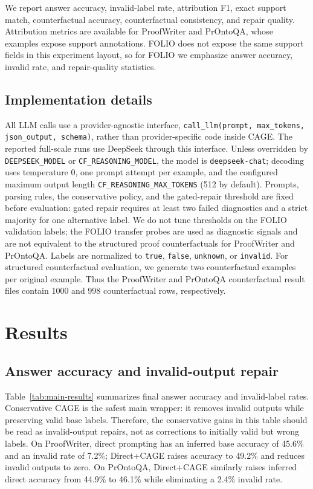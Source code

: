 \documentclass{article}
\begin{document}
We report answer accuracy, invalid-label rate, attribution F1, exact support match, counterfactual accuracy, counterfactual consistency, and repair quality. Attribution metrics are available for ProofWriter and PrOntoQA, whose examples expose support annotations. FOLIO does not expose the same support fields in this experiment layout, so for FOLIO we emphasize answer accuracy, invalid rate, and repair-quality statistics.

\subsection{Implementation details}

All LLM calls use a provider-agnostic interface, \texttt{call\_llm(prompt, max\_tokens, json\_output, schema)}, rather than provider-specific code inside CAGE. The reported full-scale runs use DeepSeek through this interface. Unless overridden by \texttt{DEEPSEEK\_MODEL} or \texttt{CF\_REASONING\_MODEL}, the model is \texttt{deepseek-chat}; decoding uses temperature 0, one prompt attempt per example, and the configured maximum output length \texttt{CF\_REASONING\_MAX\_TOKENS} (512 by default). Prompts, parsing rules, the conservative policy, and the gated-repair threshold are fixed before evaluation: gated repair requires at least two failed diagnostics and a strict majority for one alternative label. We do not tune thresholds on the FOLIO validation labels; the FOLIO transfer probes are used as diagnostic signals and are not equivalent to the structured proof counterfactuals for ProofWriter and PrOntoQA. Labels are normalized to \texttt{true}, \texttt{false}, \texttt{unknown}, or \texttt{invalid}. For structured counterfactual evaluation, we generate two counterfactual examples per original example. Thus the ProofWriter and PrOntoQA counterfactual result files contain 1000 and 998 counterfactual rows, respectively.

\section{Results}

\subsection{Answer accuracy and invalid-output repair}

Table~\ref{tab:main-results} summarizes final answer accuracy and invalid-label rates. Conservative CAGE is the safest main wrapper: it removes invalid outputs while preserving valid base labels. Therefore, the conservative gains in this table should be read as invalid-output repairs, not as corrections to initially valid but wrong labels. On ProofWriter, direct prompting has an inferred base accuracy of 45.6\% and an invalid rate of 7.2\%; Direct+CAGE raises accuracy to 49.2\% and reduces invalid outputs to zero. On PrOntoQA, Direct+CAGE similarly raises inferred direct accuracy from 44.9\% to 46.1\% while eliminating a 2.4\% invalid rate.
\end{document}
